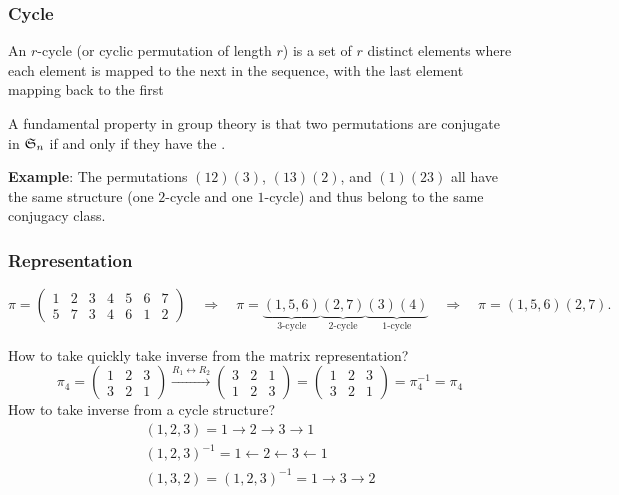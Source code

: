 \documentclass[a4paper,12pt]{article}
\theoremstyle{definition}
\begin{document}
\subsubsection*{Cycle}
An $r$-cycle (or cyclic permutation of length $r$) is a set of $r$ distinct elements where each element is mapped to the next in the sequence, with the last element mapping back to the first

\begin{enlight}[green]{\bulb}
    \tcblower
    A fundamental property in group theory is that two permutations are conjugate in $\mathfrak{S}_n$ if and only if they have the . 

    \noindent\textbf{Example}: The permutations $(12)(3)$, $(13)(2)$, and $(1)(23)$ all have the same structure (one $2$-cycle and one $1$-cycle) and thus belong to the same conjugacy class.

\end{enlight}

\subsubsection*{Representation}
\begin{equation*}
\pi = \begin{pmatrix} 
1 & 2 & 3 & 4 & 5 & 6 & 7 \\ 
5 & 7 & 3 & 4 & 6 & 1 & 2 
\end{pmatrix} \quad \Rightarrow \quad \pi = \underbrace{(1,5,6)}_{\text{3-cycle}}\underbrace{(2,7)}_{\text{2-cycle}}\underbrace{(3)(4)}_{\text{1-cycle}} \quad \Rightarrow \quad \pi = (1,5,6)(2,7).
\end{equation*}

\begin{enlight}[orange]{\think}
    \tcblower
    How to take quickly take inverse from the matrix representation?
    \[ \pi_4 = \begin{pmatrix} 1 & 2 & 3 \\ 3 & 2 & 1 \end{pmatrix} \overset{R_1 \leftrightarrow R_2}{\longrightarrow} 
    \begin{pmatrix} 3 & 2 & 1 \\ 1 & 2 & 3 \end{pmatrix}  = 
    \begin{pmatrix} 1 & 2 & 3 \\ 3 & 2 & 1 \end{pmatrix} = \pi_4^{-1} = \pi_4
    \]
    How to take inverse from a cycle structure?
    \begin{gather*}
        (1,2,3) = 1 \rightarrow 2 \rightarrow 3 \rightarrow 1 \\
        (1,2,3)^{-1} = 1 \leftarrow 2 \leftarrow 3 \leftarrow 1 \\
        (1,3,2) = (1,2,3)^{-1} = 1 \rightarrow 3 \rightarrow 2
    \end{gather*}
\end{enlight}
\end{document}
